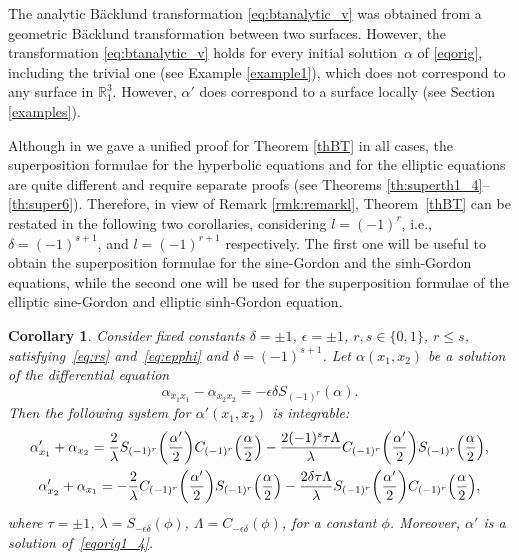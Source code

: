 \documentclass[pdftex]{sigma}
\numberwithin{equation}{section}
\newtheorem{Corollary}[Theorem]{Corollary}
\begin{document}
 The analytic B\"acklund transformation \eqref{eq:btanalytic_v} was obtained from a geometric B\"acklund transformation between two surfaces. However, the transformation \eqref{eq:btanalytic_v} holds for every initial solution~$\alpha$ of \eqref{eqorig}, including the trivial one (see Example \ref{example1}), which does not correspond to any surface in ${\mathbb{R}}^3_1$. However, $\alpha'$ does correspond to a surface locally (see Section \ref{examples}).

Although in \cite{KRT2022} we gave a unified proof for Theorem \ref{thBT} in all cases, the superposition formulae for the hyperbolic equations and for the elliptic equations are quite different and require separate proofs (see Theorems \ref{th:superth1_4}--\ref{th:super6}). Therefore,
in view of Remark \ref{rmk:remarkl}, Theorem~\ref{thBT} can be restated in the following two corollaries, considering $l=(-1)^r$, i.e., $\delta=(-1)^{s+1}$, and $l=(-1)^{r+1}$ respectively. The first one will be useful to obtain the superposition formulae for the sine-Gordon and the sinh-Gordon equations, while the second one will be used for the superposition formulae of the elliptic sine-Gordon and elliptic sinh-Gordon equation.

\begin{Corollary}\label{thBT1_4}
Consider fixed constants $\delta=\pm 1$, $\epsilon=\pm 1$,
$r,s\in \{0,1\}$, $r\leq s$, satisfying~\eqref{eq:rs} and~\eqref{eq:epphi} and
$\delta=(-1)^{s+1}$.
Let $\alpha(x_1,x_2)$ be a solution of
the differential equation
\begin{equation}\label{eqorig1_4}
\alpha_{x_1x_1}- \alpha_{x_2x_2} =-\epsilon\delta S_{(-1)^r}(\alpha).
\end{equation}
Then the following system for $\alpha'(x_1,x_2)$ is integrable:
\begin{gather}
\alpha'_{x_1}+\alpha_{x_2}=\frac{2}{\lambda}S_{(-1)^r}\biggl(\frac{\alpha'}{2}\biggr)C_{(-1)^r}\Bigl(\frac{\alpha}{2}\Bigr)-\frac{2(-1)^s\tau\Lambda}{\lambda} C_{(-1)^r}\biggl(\frac{\alpha'}{2}\biggr)S_{(-1)^r}\Bigl(\frac{\alpha}{2}\Bigr),\nonumber\\
\alpha'_{x_2}+\alpha_{x_1}=-\frac{2}{\lambda}C_{(-1)^r}\biggl(\frac{\alpha'}{2}\biggr)S_{(-1)^r}\Bigl(\frac{\alpha}{2}\Bigr)-\frac{2\delta\tau\Lambda}{\lambda} S_{(-1)^r}\biggl(\frac{\alpha'}{2}\biggr)C_{(-1)^r}\Bigl(\frac{\alpha}{2}\Bigr),\label{eq:btanalytic_vc1_4}
\end{gather}
 where $\tau=\pm 1$, $\lambda=S_{-\epsilon\delta}(\phi)$, $\Lambda=C_{-\epsilon\delta}(\phi)$, for a constant $\phi$. Moreover,
 $\alpha'$ is a solution of~\eqref{eqorig1_4}.
\end{Corollary}
\end{document}
